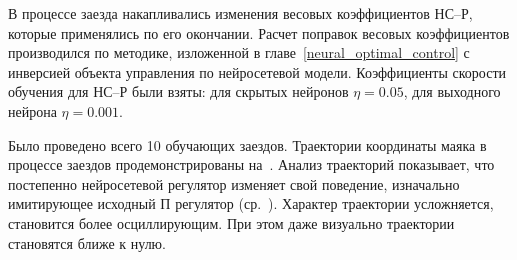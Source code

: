 В процессе заезда накапливались изменения весовых коэффициентов НС--Р,
которые применялись по его окончании.  Расчет поправок весовых
коэффициентов производился по методике, изложенной в
главе~\ref{neural_optimal_control} с инверсией объекта управления по
нейросетевой модели.  Коэффициенты скорости обучения для НС--Р были
взяты: для скрытых нейронов $\eta=0.05$, для выходного нейрона
$\eta=0.001$.

Было проведено всего 10 обучающих заездов.  Траектории координаты
маяка в процессе заездов продемонстрированы
на~.  Анализ траекторий показывает,
что постепенно нейросетевой регулятор изменяет свой поведение,
изначально имитирующее исходный П регулятор
(ср.~).  Характер траектории
усложняется, становится более осциллирующим.  При этом даже визуально
траектории становятся ближе к нулю.

